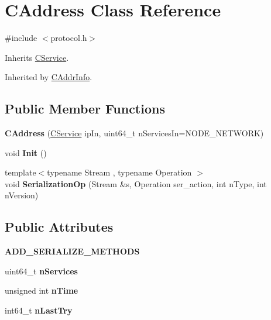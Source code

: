 \hypertarget{class_c_address}{}\section{C\+Address Class Reference}
\label{class_c_address}


{\ttfamily \#include $<$protocol.\+h$>$}



Inherits \mbox{\hyperlink{class_c_service}{C\+Service}}.



Inherited by \mbox{\hyperlink{class_c_addr_info}{C\+Addr\+Info}}.

\subsection*{Public Member Functions}
\begin{DoxyCompactItemize}
\item 
\mbox{\label{class_c_address_a806e75f363ec49bfab92a686a8774ac3}} 
{\bfseries C\+Address} (\mbox{\hyperlink{class_c_service}{C\+Service}} ip\+In, uint64\+\_\+t n\+Services\+In=N\+O\+D\+E\+\_\+\+N\+E\+T\+W\+O\+RK)
\item 
\mbox{\label{class_c_address_ac060c84dcf47b8ccfae0142c9b29a243}} 
void {\bfseries Init} ()
\item 
\mbox{\label{class_c_address_aec10c7075404eefbcf6f7a4c5671be02}} 
{\footnotesize template$<$typename Stream , typename Operation $>$ }\\void {\bfseries Serialization\+Op} (Stream \&s, Operation ser\+\_\+action, int n\+Type, int n\+Version)
\end{DoxyCompactItemize}
\subsection*{Public Attributes}
\begin{DoxyCompactItemize}
\item 
\mbox{\label{class_c_address_a9582fc22433b2ed275d4b65fb72551e7}} 
{\bfseries A\+D\+D\+\_\+\+S\+E\+R\+I\+A\+L\+I\+Z\+E\+\_\+\+M\+E\+T\+H\+O\+DS}
\item 
\mbox{\label{class_c_address_a6a4a6aa020d0d558f238c7d04dd986c3}} 
uint64\+\_\+t {\bfseries n\+Services}
\item 
\mbox{\label{class_c_address_ac1c44aac968b11f90ce529b133ae4e9b}} 
unsigned int {\bfseries n\+Time}
\item 
\mbox{\label{class_c_address_abcf198429efe135fa2424f7dbc0048b0}} 
int64\+\_\+t {\bfseries n\+Last\+Try}
\end{DoxyCompactItemize}
